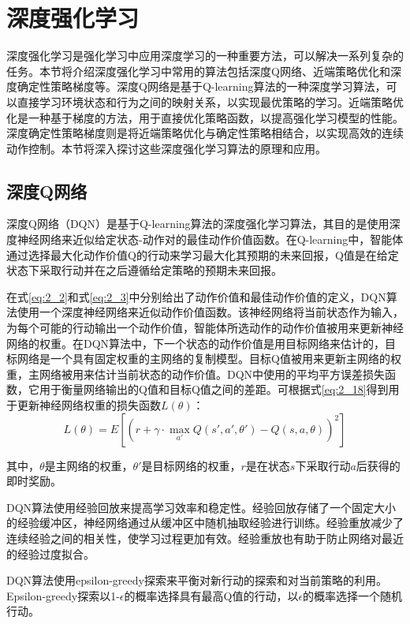 \section{深度强化学习}
\label{section:2.3}

深度强化学习是强化学习中应用深度学习的一种重要方法，可以解决一系列复杂的任务。本节将介绍深度强化学习中常用的算法包括深度Q网络、近端策略优化和深度确定性策略梯度等。深度Q网络是基于Q-learning算法的一种深度学习算法，可以直接学习环境状态和行为之间的映射关系，以实现最优策略的学习。近端策略优化是一种基于梯度的方法，用于直接优化策略函数，以提高强化学习模型的性能。深度确定性策略梯度则是将近端策略优化与确定性策略相结合，以实现高效的连续动作控制。本节将深入探讨这些深度强化学习算法的原理和应用。

\subsection{深度Q网络}

深度Q网络（DQN）是基于Q-learning算法的深度强化学习算法，其目的是使用深度神经网络来近似给定状态-动作对的最佳动作价值函数。在Q-learning中，智能体通过选择最大化动作价值Q的行动来学习最大化其预期的未来回报，Q值是在给定状态下采取行动并在之后遵循给定策略的预期未来回报。

在式\ref{eq:2_2}和式\ref{eq:2_3}中分别给出了动作价值和最佳动作价值的定义，DQN算法使用一个深度神经网络来近似动作价值函数。该神经网络将当前状态作为输入，为每个可能的行动输出一个动作价值，智能体所选动作的动作价值被用来更新神经网络的权重。在DQN算法中，下一个状态的动作价值是用目标网络来估计的，目标网络是一个具有固定权重的主网络的复制模型。目标Q值被用来更新主网络的权重，主网络被用来估计当前状态的动作价值。DQN中使用的平均平方误差损失函数，它用于衡量网络输出的Q值和目标Q值之间的差距。可根据式\ref{eq:2_18}得到用于更新神经网络权重的损失函数$L(\theta)$：
\begin{equation}
\label{eq:2_22}
L(\theta) = E\left[\left(r + \gamma \cdot \max _{a'} Q(s', a', \theta') - Q(s, a, \theta)\right)^2\right ]
\end{equation}


其中，$\theta$是主网络的权重，$\theta '$是目标网络的权重，$r$是在状态$s$下采取行动$a$后获得的即时奖励。

DQN算法使用经验回放来提高学习效率和稳定性。经验回放存储了一个固定大小的经验缓冲区，神经网络通过从缓冲区中随机抽取经验进行训练。经验重放减少了连续经验之间的相关性，使学习过程更加有效。经验重放也有助于防止网络对最近的经验过度拟合。

DQN算法使用epsilon-greedy探索来平衡对新行动的探索和对当前策略的利用。Epsilon-greedy探索以1-$\epsilon$的概率选择具有最高Q值的行动，以$\epsilon$的概率选择一个随机行动。

